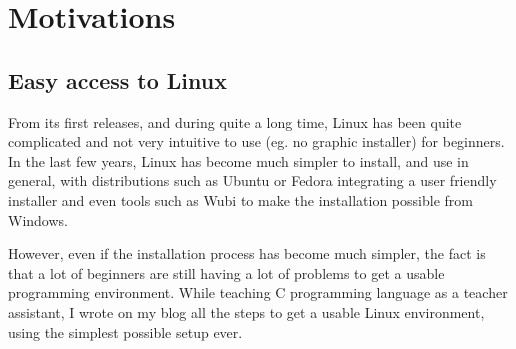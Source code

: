 \section{Motivations}
\subsection{Easy access to Linux}
From its first releases, and during quite a long time, Linux has been quite 
complicated and not very intuitive to use (eg. no graphic installer) for beginners.
In the last few years, Linux has become much simpler to install, and use in general, 
with distributions such as Ubuntu or Fedora integrating a user friendly installer 
and even tools such as Wubi to make the installation possible from Windows.

However, even if the installation process has become much simpler, the fact is that 
a lot of beginners are still having a lot of problems to get a usable programming 
environment. While teaching C programming language as a teacher assistant, I wrote 
on my blog all the steps to get a usable Linux environment, using the simplest 
possible setup ever.

